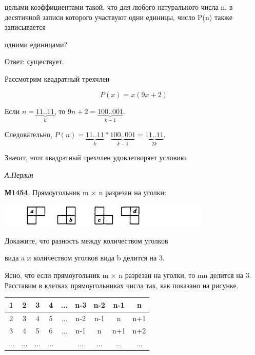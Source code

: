 \begin{multicols}{2}
целыми коэффициентами такой, что для любого натурального числа n, в десятичной записи которого участвуют одни единицы, число P(n) также записывается

одними единицами? 

Ответ: существует.

Рассмотрим квадратный трехчлен

$$P(x) = x(9x + 2)$$

Если $n=\underbrace{11..11}_{k}$, то $9n + 2 = \underbrace{100..001}_{k-1}$.

Следовательно, $P(n) = \underbrace{11..11}_{k} *\underbrace{100..001}_{k-1}= \underbrace{11..11}_{2k}$.

Значит, этот квадратный трехчлен удовлетворяет условию.

\textit{А.Перлин}

\vspace { 3mm }

\textbf{М1454}. Прямоугольник m × n разрезан на уголки:

\includegraphics {2} 

Докажите, что разность между количеством уголков

вида a и количеством уголков вида b делится на 3.

\vspace { 3mm }

Ясно, что если прямоугольник m × n разрезан на уголки, то mn делится на 3. Расставим в клетках прямоугольниках числа так, как показано на рисунке.

\begin{center}

\addtolength{\tabcolsep}{-3pt}

\begin{tabular}{|c|c|c|c|c|c|c|c|c|}

\hline

1 & 2 & 3 & 4 & ... & n-3 & n-2 & n-1 & n \\

\hline

2 & 3 & 4 & 5 & ... & n-2 & n-1 & n & n+1 \\

\hline

3 & 4 & 5 & 6 & ... & n-1 & n & n+1 & n+2 \\

\hline

... & ... & ... & ... & & ... & ... & ... & ... \\


\end{tabular}
\end{center}
\end{multicols}

